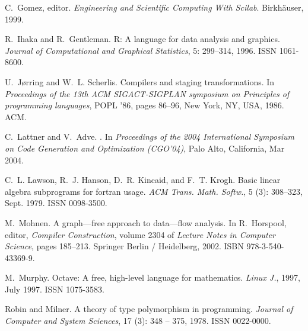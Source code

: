 \documentclass[9pt]{sigplanconf}
\begin{document}
\begin{thebibliography}{16}
C.~Gomez, editor.
\newblock \emph{Engineering and Scientific Computing With Scilab}.
\newblock Birkh{\"a}user, 1999.

R.~Ihaka and R.~Gentleman.
\newblock R: A language for data analysis and graphics.
\newblock \emph{Journal of Computational and Graphical Statistics}, 5:
  299--314, 1996.
\newblock ISSN 1061-8600.

U.~J{\o}rring and W.~L. Scherlis.
\newblock Compilers and staging transformations.
\newblock In \emph{Proceedings of the 13th ACM SIGACT-SIGPLAN symposium on
  Principles of programming languages}, POPL '86, pages 86--96, New York, NY,
  USA, 1986. ACM.

C.~Lattner and V.~Adve.
.
\newblock In \emph{{Proceedings of the 2004 International Symposium on Code
  Generation and Optimization (CGO'04)}}, Palo Alto, California, Mar 2004.

C.~L. Lawson, R.~J. Hanson, D.~R. Kincaid, and F.~T. Krogh.
\newblock Basic linear algebra subprograms for fortran usage.
\newblock \emph{ACM Trans. Math. Softw.}, 5 (3): 308--323,
  Sept. 1979.
\newblock ISSN 0098-3500.

M.~Mohnen.
\newblock A graph—free approach to data—flow analysis.
\newblock In R.~Horspool, editor, \emph{Compiler Construction}, volume 2304 of
  \emph{Lecture Notes in Computer Science}, pages 185--213. Springer Berlin /
  Heidelberg, 2002.
\newblock ISBN 978-3-540-43369-9.

M.~Murphy.
\newblock Octave: A free, high-level language for mathematics.
\newblock \emph{Linux J.}, 1997, July 1997.
\newblock ISSN 1075-3583.

Robin and Milner.
\newblock A theory of type polymorphism in programming.
\newblock \emph{Journal of Computer and System Sciences}, 17
  (3): 348 -- 375, 1978.
\newblock ISSN 0022-0000.


\end{thebibliography}
\end{document}
